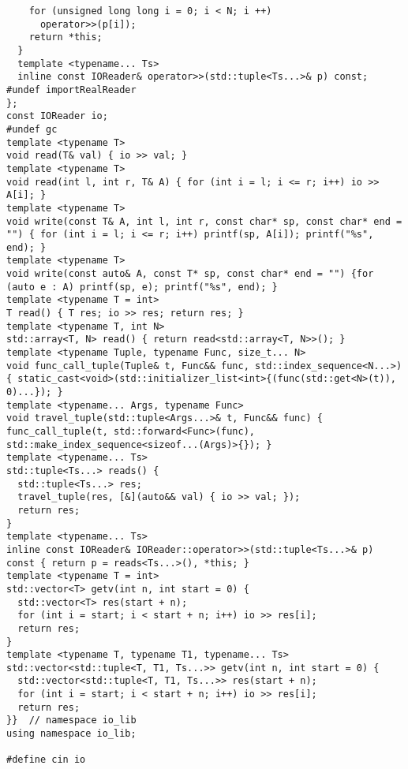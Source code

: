 \begin{lstlisting}
    for (unsigned long long i = 0; i < N; i ++)
      operator>>(p[i]);
    return *this;
  }
  template <typename... Ts>
  inline const IOReader& operator>>(std::tuple<Ts...>& p) const;
#undef importRealReader
};
const IOReader io;
#undef gc
template <typename T>
void read(T& val) { io >> val; }
template <typename T>
void read(int l, int r, T& A) { for (int i = l; i <= r; i++) io >> A[i]; }
template <typename T>
void write(const T& A, int l, int r, const char* sp, const char* end = "") { for (int i = l; i <= r; i++) printf(sp, A[i]); printf("%s", end); }
template <typename T>
void write(const auto& A, const T* sp, const char* end = "") {for (auto e : A) printf(sp, e); printf("%s", end); }
template <typename T = int>
T read() { T res; io >> res; return res; }
template <typename T, int N>
std::array<T, N> read() { return read<std::array<T, N>>(); }
template <typename Tuple, typename Func, size_t... N>
void func_call_tuple(Tuple& t, Func&& func, std::index_sequence<N...>) { static_cast<void>(std::initializer_list<int>{(func(std::get<N>(t)), 0)...}); }
template <typename... Args, typename Func>
void travel_tuple(std::tuple<Args...>& t, Func&& func) { func_call_tuple(t, std::forward<Func>(func), std::make_index_sequence<sizeof...(Args)>{}); }
template <typename... Ts>
std::tuple<Ts...> reads() {
  std::tuple<Ts...> res;
  travel_tuple(res, [&](auto&& val) { io >> val; });
  return res;
}
template <typename... Ts>
inline const IOReader& IOReader::operator>>(std::tuple<Ts...>& p) const { return p = reads<Ts...>(), *this; }
template <typename T = int>
std::vector<T> getv(int n, int start = 0) {
  std::vector<T> res(start + n);
  for (int i = start; i < start + n; i++) io >> res[i];
  return res;
}
template <typename T, typename T1, typename... Ts>
std::vector<std::tuple<T, T1, Ts...>> getv(int n, int start = 0) {
  std::vector<std::tuple<T, T1, Ts...>> res(start + n);
  for (int i = start; i < start + n; i++) io >> res[i];
  return res;
}}  // namespace io_lib
using namespace io_lib;

#define cin io
\end{lstlisting}

